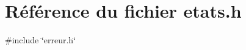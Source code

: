 \section{Référence du fichier etats.h}
\label{etats_8h}
{\ttfamily \#include \char`\"{}erreur.h\char`\"{}}\par
